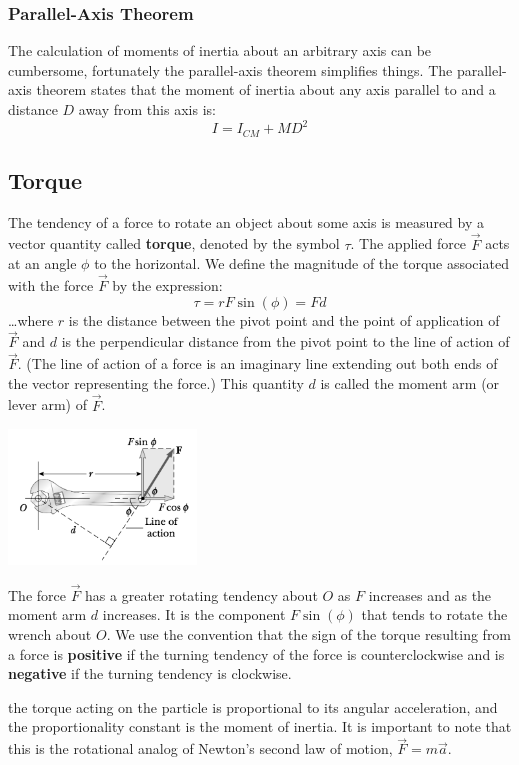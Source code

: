 \documentclass{article}
\begin{document}
        \subsubsection{Parallel-Axis Theorem}
        	The calculation of moments of inertia about an arbitrary axis can be cumbersome, fortunately the parallel-axis theorem simplifies things. The parallel-axis theorem states that the moment of inertia about any axis parallel to and a distance $D$ away from this axis is:
        	\[
        		I=I_{CM}+MD^2
        	\]
	\subsection{Torque}
    	The tendency of a force to rotate an object about some axis is measured by a vector quantity called \textbf{torque}, denoted by the symbol $\tau$. The applied force $\vec{F}$ acts at an angle $\phi$ to the horizontal. We define the magnitude of the torque associated with the force $\vec{F}$ by the expression:
        \[
        	\tau=rF\sin(\phi)=Fd
        \]
        \ldots where $r$ is the distance between the pivot point and the point of application of $\vec{F}$ and $d$ is the perpendicular distance from the pivot point to the line of action of $\vec{F}$. (The line of action of a force is an imaginary line extending out both ends of the vector representing the force.) This quantity $d$ is called the moment arm (or lever arm) of $\vec{F}$.
        \begin{multicols}{2}
        	\centerline{\includegraphics[width=5cm]{wrench.png}}
		\columnbreak
        	The force $\vec{F}$ has a greater rotating tendency about $O$ as $F$ increases and as the moment arm $d$ increases. It is the component $F\sin(\phi)$ that tends to rotate the wrench about $O$. We use the convention that the sign of the torque resulting from a force is \textbf{positive} if the turning tendency of the force is counterclockwise and is \textbf{negative} if the turning tendency is clockwise.
        \end{multicols}
        the torque acting on the particle is proportional to its angular acceleration, and the proportionality constant is the moment of inertia. It is important to note that this is the rotational analog of Newton’s second law of motion, $\vec{F}=m\vec{a}$.
\end{document}

